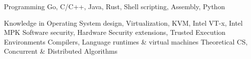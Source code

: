 


\begin{cvskills}



\cvskill
{Programming} %
{Go, C/C++, Java, Rust, Shell scripting, Assembly, Python} %


\cvskill
{Knowledge in} %
{\linebreak  Operating System design, Virtualization, KVM, Intel VT-x, Intel MPK\linebreak
 Software security, Hardware Security extensions, Trusted Execution Environments\linebreak
 Compilers, Language runtimes \& virtual machines\linebreak
 Theoretical CS, Concurrent \& Distributed Algorithms} %

\end{cvskills}
